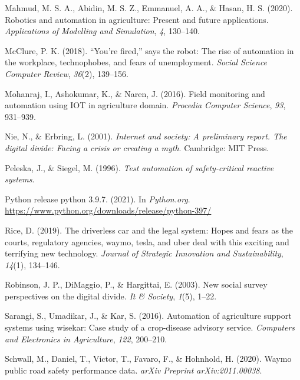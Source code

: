 \documentclass[
  man,floatsintext]{apa7}
\newlength{\cslhangindent}
\newlength{\cslentryspacingunit} %
\newenvironment{CSLReferences}[2] %
 {%
  \setlength{\parindent}{0pt}
  \ifodd #1
  \let\oldpar\par
  \def\par{\hangindent=\cslhangindent\oldpar}
  \fi
  \setlength{\parskip}{#2\cslentryspacingunit}
 }%
 {}
\begin{document}
\begin{CSLReferences}{1}{0}
\leavevmode{}%
Mahmud, M. S. A., Abidin, M. S. Z., Emmanuel, A. A., \& Hasan, H. S. (2020). Robotics and automation in agriculture: Present and future applications. \emph{Applications of Modelling and Simulation}, \emph{4}, 130--140.

\leavevmode{}%
McClure, P. K. (2018). {``You're fired,''} says the robot: The rise of automation in the workplace, technophobes, and fears of unemployment. \emph{Social Science Computer Review}, \emph{36}(2), 139--156.

\leavevmode{}%
Mohanraj, I., Ashokumar, K., \& Naren, J. (2016). Field monitoring and automation using IOT in agriculture domain. \emph{Procedia Computer Science}, \emph{93}, 931--939.

\leavevmode{}%
Nie, N., \& Erbring, L. (2001). \emph{Internet and society: A preliminary report. The digital divide: Facing a crisis or creating a myth}. Cambridge: MIT Press.

\leavevmode{}%
Peleska, J., \& Siegel, M. (1996). \emph{Test automation of safety-critical reactive systems}.

\leavevmode{}%
Python release python 3.9.7. (2021). In \emph{Python.org}. \url{https://www.python.org/downloads/release/python-397/}

\leavevmode{}%
Rice, D. (2019). The driverless car and the legal system: Hopes and fears as the courts, regulatory agencies, waymo, tesla, and uber deal with this exciting and terrifying new technology. \emph{Journal of Strategic Innovation and Sustainability}, \emph{14}(1), 134--146.

\leavevmode{}%
Robinson, J. P., DiMaggio, P., \& Hargittai, E. (2003). New social survey perspectives on the digital divide. \emph{It \& Society}, \emph{1}(5), 1--22.

\leavevmode{}%
Sarangi, S., Umadikar, J., \& Kar, S. (2016). Automation of agriculture support systems using wisekar: Case study of a crop-disease advisory service. \emph{Computers and Electronics in Agriculture}, \emph{122}, 200--210.

\leavevmode{}%
Schwall, M., Daniel, T., Victor, T., Favaro, F., \& Hohnhold, H. (2020). Waymo public road safety performance data. \emph{arXiv Preprint arXiv:2011.00038}.


\end{CSLReferences}
\end{document}
